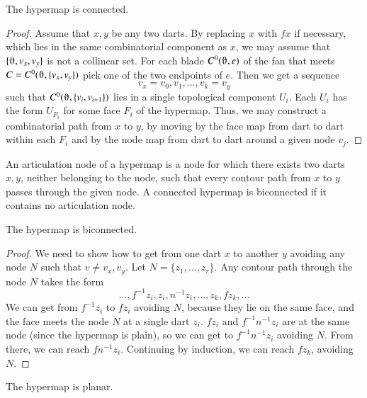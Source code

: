 \begin{corollary}  The hypermap is connected.
\end{corollary}

\begin{proof} Assume that $x,y$ be any two darts.  By replacing $x$ with $f x$ if necessary, which lies in the same combinatorial component as $x$, we may
assume that $\{\orgn,v_x,v_y\}$ is not a collinear set. 
For each blade $C^0(\orgn,e)$ of the fan that meets $C=C^0(\orgn,\{v_x,v_y\})$
pick one of the two endpoints of $e$.  Then we get a sequence
$$
v_x=v_0,v_1,\ldots,v_k=v_y
$$
such that $C^0(\orgn,\{v_i,v_{i+1}\})$ lies in a single topological component $U_i$.  Each $U_i$ has the form $U_{F_i}$ for some face $F_i$ of the hypermap.
Thus, we may construct a combinatorial path from $x$ to $y$, by moving by the face map from dart to dart within each $F_i$ and by the node map from dart to dart around a given node $v_j$.
\end{proof}

\begin{definition}
An articulation node of a hypermap is a node for which
there exists two darts $x,y$, 
neither belonging to the node,
such that every contour path from $x$ to $y$ passes
through the given node.
A connected hypermap is biconnected
if it contains no articulation node.  
\end{definition}

\begin{corollary} The hypermap is biconnected.
\end{corollary}

\begin{proof} We need to show how to get from one dart $x$ to another $y$
avoiding any node $N$ such that $v\ne v_x,v_y$.  Let $N = \{z_1,\ldots,z_r\}$.
Any contour path through the node $N$ takes the form 
$$\ldots, f^{-1} z_i, z_i, n^{-1} z_i,\ldots, z_k, f z_k,\ldots$$
We can get from $f^{-1} z_i$ to $f z_i$ avoiding $N$, because they
lie on the same face, and the face meets the node $N$ at a single dart $z_i$.
$f z_i$ and $f^{-1} n^{-1} z_i$ are at the same node (since the hypermap is plain), so we can get to $f^{-1} n^{-1} z_i$ avoiding $N$.  From there,
we can reach $f n^{-1} z_i$.  Continuing by induction,
we can reach $f z_k$, avoiding $N$.
\end{proof}

\begin{corollary}  The hypermap is planar.
\end{corollary}

